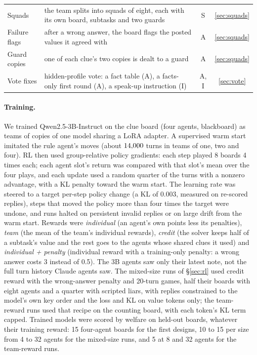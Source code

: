 \documentclass{article}
\begin{document}
\begin{table}[t]
\begin{tabular}{@{}l>{\raggedright\arraybackslash}p{7.9cm}cc@{}}
Squads & the team splits into squads of eight, each with its own board, subtasks and two guards & S & \ref{sec:squads} \\
Failure flags & after a wrong answer, the board flags the posted values it agreed with & A & \ref{sec:squads} \\
Guard copies & one of each clue's two copies is dealt to a guard & A & \ref{sec:squads} \\
Vote fixes & hidden-profile vote: a fact table (A), a facts-only first round (A), a speak-up instruction (I) & A, I & \ref{sec:vote} \\
\bottomrule
\end{tabular}
\end{table}

\paragraph{Training.} We trained Qwen2.5-3B-Instruct on the clue board (four agents, blackboard) as teams of copies of one model sharing a LoRA adapter. A supervised warm start imitated the rule agent's moves (about $14{,}000$ turns in teams of one, two and four). RL then used group-relative policy gradients: each step played 8 boards 4 times each; each agent slot's return was compared with that slot's mean over the four plays, and each update used a random quarter of the turns with a nonzero advantage, with a KL penalty toward the warm start. The learning rate was steered to a target per-step policy change (a KL of 0.003, measured on re-scored replies), steps that moved the policy more than four times the target were undone, and runs halted on persistent invalid replies or on large drift from the warm start. Rewards were \emph{individual} (an agent's own points less its penalties), \emph{team} (the mean of the team's individual rewards), \emph{credit} (the solver keeps half of a subtask's value and the rest goes to the agents whose shared clues it used) and \emph{individual + penalty} (individual reward with a training-only penalty: a wrong answer costs 3 instead of 0.5). The 3B agents saw only their latest note, not the full turn history Claude agents saw. The mixed-size runs of \S\ref{sec:rl} used credit reward with the wrong-answer penalty and 20-turn games, half their boards with eight agents and a quarter with scripted liars, with replies constrained to the model's own key order and the loss and KL on value tokens only; the team-reward runs used that recipe on the counting board, with each token's KL term capped. Trained models were scored by welfare on held-out boards, whatever their training reward: 15 four-agent boards for the first designs, 10 to 15 per size from 4 to 32 agents for the mixed-size runs, and 5 at 8 and 32 agents for the team-reward runs.
\end{document}
